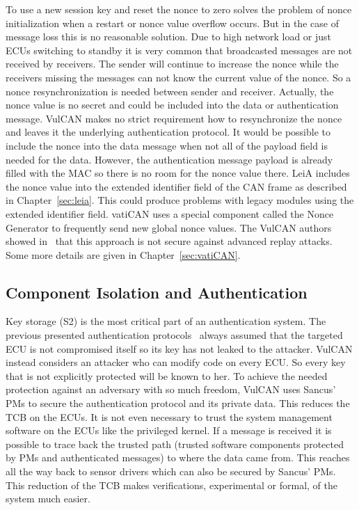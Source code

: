 To use a new session key and reset the nonce to zero solves the problem of nonce
initialization when a restart or nonce value overflow occurs. But in the case of
message loss this is no reasonable solution. Due to high network load or just
ECUs switching to standby it is very common that broadcasted messages are not
received by receivers. The sender will continue to increase the nonce while the
receivers missing the messages can not know the current value of the nonce. So a
nonce resynchronization is needed between sender and receiver. Actually, the
nonce value is no secret and could be included into the data or authentication
message. VulCAN makes no strict requirement how to resynchronize the nonce and
leaves it the underlying authentication protocol. It would be possible to
include the nonce into the data message when not all of the payload field is
needed for the data. However, the authentication message payload is already filled with
the MAC so there is no room for the nonce value there. LeiA includes the nonce
value into the extended identifier field of the CAN frame as described in
Chapter~\ref{sec:leia}. This could produce problems with legacy modules using
the extended identifier field\@. vatiCAN uses a special component called the
Nonce Generator to frequently send new global nonce values. The VulCAN authors
showed in~\cite{VanBulck2017} that this approach is not secure against advanced
replay attacks. Some more details are given in Chapter~\ref{sec:vatiCAN}.

\subsection{Component Isolation and Authentication}\label{subsec:vulcan-component-isolation}

Key storage (S2) is the most critical part of an authentication system. The
previous presented authentication
protocols~\cite{Koscher2010,Nurnberger2016,Hazem2012,Radu2016,Bruni2014} always
assumed that the targeted ECU is not compromised itself so its key has not
leaked to the attacker. VulCAN instead considers an attacker who can modify code
on every ECU\@. So every key that is not explicitly protected will be known to
her. To achieve the needed protection against an adversary with so much freedom,
VulCAN uses Sancus' PMs to secure the authentication protocol and its private
data. This reduces the TCB on the ECUs. It is not even necessary to trust the
system management software on the ECUs like the privileged kernel. If a message
is received it is possible to trace back the trusted path (trusted software
components protected by PMs and authenticated messages) to where the data came
from. This reaches all the way back to sensor drivers which can also be secured
by Sancus' PMs. This reduction of the TCB makes verifications, experimental or
formal, of the system much easier.

